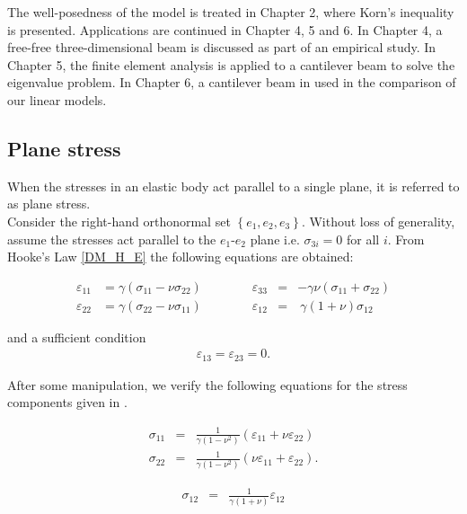 \documentclass[../../main.tex]{subfiles}
\begin{document}
The well-posedness of the model is treated in Chapter 2, where Korn's
inequality is presented. Applications are continued in Chapter 4, 5 and 6. In
Chapter 4, a free-free three-dimensional beam is discussed as part of an
empirical study. In Chapter 5, the finite element analysis is applied to a
cantilever beam to solve the eigenvalue problem. In Chapter 6, a cantilever
beam in used in the comparison of our linear models.

\subsection{Plane stress}\label{ssec:3D_Model:PlaneStress}
When the stresses in an elastic body act parallel to a single plane, it is
referred to as plane stress.\\

Consider the right-hand orthonormal set $\left\{e_1, e_2, e_3\right\}$. Without
loss of generality, assume the stresses act parallel to the $e_1$-$e_2$ plane
i.e. $\sigma_{3i} = 0$ for all $i$. From Hooke's Law \eqref{DM_H_E} the
following equations are obtained:

\begin{equation}
	\begin{aligned}
		\varepsilon_{11} & =  \gamma  ( \sigma_{11} - \nu \sigma_{22}) \qquad \qquad \varepsilon_{33} & = & - \gamma \nu (\sigma_{11} + \sigma_{22})          \\
		\varepsilon_{22} & =   \gamma (\sigma_{22} - \nu\sigma_{11}) \qquad \qquad \varepsilon_{12}   & = & \  \gamma (1+\nu) \sigma_{12} \label{strain_comp}
	\end{aligned}
\end{equation}

and a sufficient condition
\begin{eqnarray}
	\varepsilon_{13} =  \varepsilon_{23} = 0.
\end{eqnarray}

After some manipulation, we verify the following equations for the stress
components given in \cite{Fung65}.

\noindent
\begin{minipage}{.5\linewidth}
	\begin{eqnarray*}
		\sigma_{11} & = & \frac{1}{\gamma(1-\nu^2)} ( \varepsilon_{11} + \nu\varepsilon_{22})\\
		\sigma_{22} & = & \frac{1}{\gamma(1-\nu^2)} (\nu \varepsilon_{11} + \varepsilon_{22}).
	\end{eqnarray*}
\end{minipage}%
\begin{minipage}{.5\linewidth}
	\begin{eqnarray}
		\sigma_{12} & = & \frac{1}{\gamma(1+\nu)} \varepsilon_{12} \label{stress_comp}
	\end{eqnarray}
\end{minipage}\\
\end{document}
